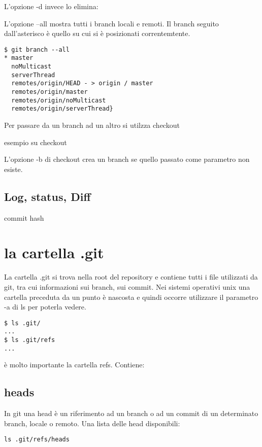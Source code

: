 \documentclass{article} \usepackage[textwidth=18cm,textheight=18cm]{geometry}
\begin{document}
L'opzione -d invece lo elimina:


L'opzione --all mostra tutti i branch locali e remoti. Il branch seguito
dall'asterisco è quello su cui si è posizionati correntemtente.

\begin{verbatim}
$ git branch --all
* master
  noMulticast
  serverThread
  remotes/origin/HEAD - > origin / master
  remotes/origin/master
  remotes/origin/noMulticast
  remotes/origin/serverThread}
\end{verbatim}

Per passare da un branch ad un altro si utilzza checkout

esempio su checkout 

L'opzione -b di checkout crea un branch se quello passato come parametro non
esiste.

\subsection{Log, status, Diff}

commit hash

\section{la cartella .git}

La cartella .git si trova nella root del repository e contiene tutti i file
utilizzati da git, tra cui informazioni sui branch, sui commit. Nei sistemi
operativi unix una cartella preceduta da un punto è nascosta e quindi occorre
utilizzare il parametro -a di ls per poterla vedere.

\begin{verbatim}
$ ls .git/
...
$ ls .git/refs
...
\end{verbatim}

è molto importante la cartella refs. Contiene:

\subsection{heads}

In git una head è un riferimento ad un branch o ad un commit di un determinato
branch, locale o remoto. Una lista delle head disponibili:

\begin{verbatim}
ls .git/refs/heads
\end{verbatim}
\end{document}
